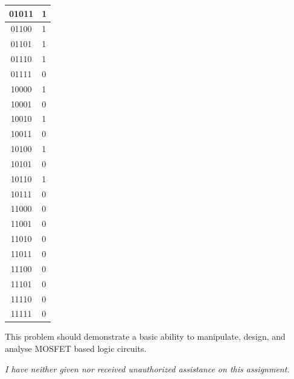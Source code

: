 \documentclass[12pt,letterpaper,titlepage]{article}
\begin{document}
\begin{raggedright}
\begin{center}
\begin{paracol}{2}
\begin{tabular}{| c | l |}
\\\hline 01011 & 1
\\\hline 01100 & 1
\\\hline 01101 & 1
\\\hline 01110 & 1
\\\hline 01111 & 0
\\\hline 10000 & 1
\\\hline 10001 & 0
\\\hline 10010 & 1
\\\hline 10011 & 0
\\\hline 10100 & 1
\\\hline 10101 & 0
\\\hline 10110 & 1
\\\hline 10111 & 0
\\\hline 11000 & 0
\\\hline 11001 & 0
\\\hline 11010 & 0
\\\hline 11011 & 0
\\\hline 11100 & 0
\\\hline 11101 & 0
\\\hline 11110 & 0
\\\hline 11111 & 0
\\\hline
\end{tabular}
\end{paracol}
\end{center}

This problem should demonstrate a basic ability to manipulate, design, and analyse MOSFET based logic circuits. 

\textit{I have neither given nor received unauthorized assistance on this assignment.}


\end{raggedright}
\end{document}
